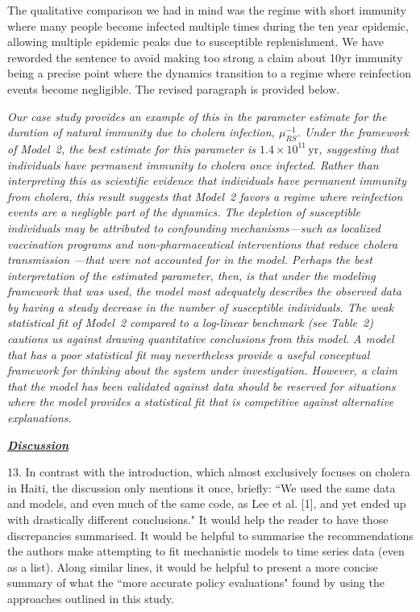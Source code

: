 \documentclass[11pt]{article}
\newcommand\muRS{\mu_{RS}}
\newcommand\report[1]{{\color{mygreen} \vspace{1mm}\hspace{0.25in}\parbox{6in}{\em #1}}}
\newcommand\article[1]{{\color{blue} \vspace{1mm}\hspace{0.25in}\parbox{6in}{\em #1}}}
\begin{document}
The qualitative comparison we had in mind was the regime with short immunity where many people become infected multiple times during the ten year epidemic, allowing multiple epidemic peaks due to susceptible replenishment.
We have reworded the sentence to avoid making too strong a claim about 10yr immunity being a precise point where the dynamics transition to a regime where reinfection events become negligible.
The revised paragraph is provided below.

\article{Our case study provides an example of this in the parameter estimate for the duration of natural immunity due to cholera infection, $\muRS^{-1}$.
Under the framework of Model~2, the best estimate for this parameter is $1.4 \times 10^{11} \, \mathrm{yr}$, suggesting that individuals have permanent immunity to cholera once infected.
Rather than interpreting this as scientific evidence that individuals have permanent immunity from cholera, this result suggests that Model~2 favors a regime where reinfection events are a negligble part of the dynamics.
The depletion of susceptible individuals may be attributed to confounding mechanisms---such as localized vaccination programs and non-pharmaceutical interventions that reduce cholera transmission \cite{trevisin22, rebaudet21}---that were not accounted for in the model.
Perhaps the best interpretation of the estimated parameter, then, is that under the modeling framework that was used, the model most adequately describes the observed data by having a steady decrease in the number of susceptible individuals.
The weak statistical fit of Model~2 compared to a log-linear benchmark (see Table~2) cautions us against drawing quantitative conclusions from this model.
A model that has a poor statistical fit may nevertheless provide a useful conceptual framework for thinking about the system under investigation.
However, a claim that the model has been validated against data should be reserved for situations where the model provides a statistical fit that is competitive against alternative explanations.}


\report{
  \textbf{\underline{Discussion}}

13. In contrast with the introduction, which almost exclusively focuses on cholera in Haiti, the discussion only mentions it once, briefly: ``We used the same data and models, and even much of the same code, as Lee et al. [1], and yet ended up with drastically different conclusions." It would help the reader to have those discrepancies summarised. It would be helpful to summarise the recommendations the authors make attempting to fit mechanistic models to time series data (even as a list). Along similar lines, it would be helpful to present a more concise summary of what the ``more accurate policy evaluations" found by using the approaches outlined in this study.
}
\end{document}
